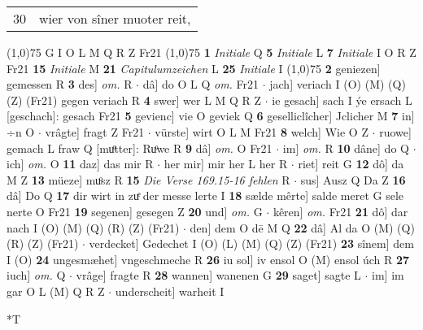 \documentclass[8pt,a4paper,notitlepage]{article}
\begin{document}
\begin{table}[ht]
\begin{minipage}[t]{0.5\linewidth}
\begin{tabular}{rl}
30 & wier von sîner muoter reit,\\ 
\end{tabular}
\scriptsize
\line(1,0){75} \newline
G I O L M Q R Z Fr21 \newline
\line(1,0){75} \newline
\textbf{1} \textit{Initiale} Q  \textbf{5} \textit{Initiale} L  \textbf{7} \textit{Initiale} I O R Z Fr21  \textbf{15} \textit{Initiale} M  \textbf{21} \textit{Capitulumzeichen} L  \textbf{25} \textit{Initiale} I  \newline
\line(1,0){75} \newline
\textbf{2} geniezen] gemessen R \textbf{3} des] \textit{om.} R  $\cdot$ dâ] do O L Q \textit{om.} Fr21  $\cdot$ jach] veriach I (O) (M) (Q) (Z) (Fr21) gegen veriach R \textbf{4} swer] wer L M Q R Z  $\cdot$ ie gesach] sach I ýe ersach L [geschach]: gesach Fr21 \textbf{5} gevienc] vie O geviek Q \textbf{6} geselliclîcher] Jclicher M \textbf{7} in] ÷n O  $\cdot$ vrâgte] fragt Z Fr21  $\cdot$ vürste] wirt O L M Fr21 \textbf{8} welch] Wie O Z  $\cdot$ ruowe] gemach L fraw Q [muͦtter]: Ruͦwe R \textbf{9} dâ] \textit{om.} O Fr21  $\cdot$ im] \textit{om.} R \textbf{10} dâne] do Q  $\cdot$ ich] \textit{om.} O \textbf{11} daz] das mir R  $\cdot$ her mir] mir her L her R  $\cdot$ riet] reit G \textbf{12} dô] da M Z \textbf{13} müeze] muͦsz R \textbf{15} \textit{Die Verse 169.15-16 fehlen} R   $\cdot$ sus] Ausz Q Da Z \textbf{16} dâ] Do Q \textbf{17} dir wirt in zuͤ der messe lerte I \textbf{18} sælde mêrte] salde meret G sele nerte O Fr21 \textbf{19} segenen] gesegen Z \textbf{20} und] \textit{om.} G  $\cdot$ kêren] \textit{om.} Fr21 \textbf{21} dô] dar nach I (O) (M) (Q) (R) (Z) (Fr21)  $\cdot$ den] dem O dē M Q \textbf{22} dâ] Al da O (M) (Q) (R) (Z) (Fr21)  $\cdot$ verdecket] Gedechet I (O) (L) (M) (Q) (Z) (Fr21) \textbf{23} sînem] dem I (O) \textbf{24} ungesmæhet] vngeschmeche R \textbf{26} iu sol] iv ensol O (M) ensol úch R \textbf{27} iuch] \textit{om.} Q  $\cdot$ vrâge] fragte R \textbf{28} wannen] wanenen G \textbf{29} saget] sagte L  $\cdot$ im] im gar O L (M) Q R Z  $\cdot$ underscheit] warheit I \newline
\end{minipage}
\hspace{0.5cm}
\begin{minipage}[t]{0.5\linewidth}
\small
\begin{center}*T
\end{center}
\begin{tabular}{rl}

\end{tabular}
\end{minipage}
\end{table}
\end{document}
